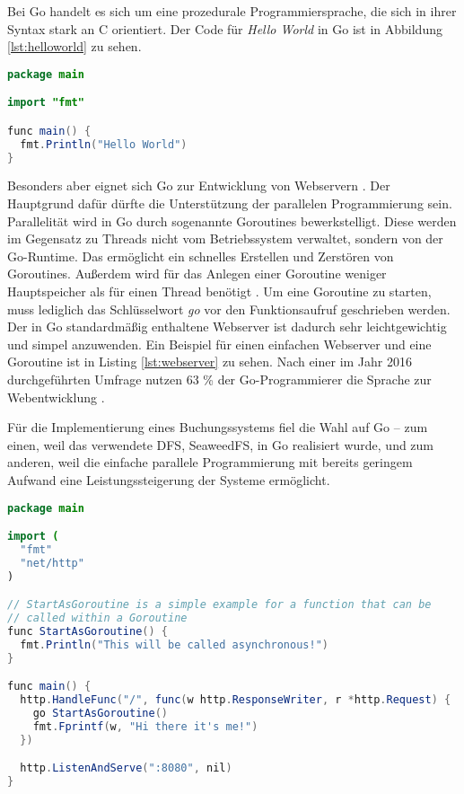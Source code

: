 \documentclass[12pt,oneside,a4paper,parskip]{scrbook}
\begin{document}
Bei Go handelt es sich um eine prozedurale Programmiersprache, die sich in ihrer Syntax stark an C orientiert. Der Code für \textit{Hello World} in Go ist in Abbildung \ref{lst:helloworld} zu sehen.
\begin{lstlisting}[label=lst:helloworld,
           language=Java,
           firstnumber=1,
           caption=Hello World mit Go.]           
package main

import "fmt"

func main() {
  fmt.Println("Hello World")
}

\end{lstlisting}

Besonders aber eignet sich Go zur Entwicklung von Webservern \cite[3-22]{gowebprogramming}. Der Hauptgrund dafür dürfte die Unterstützung der parallelen Programmierung sein. Parallelität wird in Go durch sogenannte Goroutines bewerkstelligt. Diese werden im Gegensatz zu Threads nicht vom Betriebssystem verwaltet, sondern von der Go-Runtime. Das ermöglicht ein schnelles Erstellen und Zerstören von Goroutines. Außerdem wird für das Anlegen einer Goroutine weniger Hauptspeicher als für einen Thread benötigt \cite{goroutines}. Um eine Goroutine zu starten, muss lediglich das Schlüsselwort \textit{go} vor den Funktionsaufruf geschrieben werden. Der in Go standardmäßig  enthaltene Webserver ist dadurch sehr leichtgewichtig und simpel anzuwenden. Ein Beispiel für einen einfachen Webserver und eine Goroutine ist in Listing \ref{lst:webserver} zu sehen. Nach einer im Jahr 2016 durchgeführten Umfrage nutzen 63 \% der Go-Programmierer die Sprache zur Webentwicklung \cite{gosurvey}.

Für die Implementierung eines Buchungssystems fiel die Wahl auf Go – zum einen, weil das verwendete DFS, SeaweedFS, in Go realisiert wurde, und zum anderen, weil die einfache parallele Programmierung mit bereits geringem Aufwand eine Leistungssteigerung der Systeme ermöglicht.

\begin{minipage}{\linewidth}
\begin{lstlisting}[label=lst:webserver,
           language=Java,
           firstnumber=1,
           caption=Code für einen einfachen Webserver in Go und Beispiel einer Goroutine.]           
package main

import (
  "fmt"
  "net/http"
)

// StartAsGoroutine is a simple example for a function that can be 
// called within a Goroutine
func StartAsGoroutine() {
  fmt.Println("This will be called asynchronous!")
}

func main() {
  http.HandleFunc("/", func(w http.ResponseWriter, r *http.Request) {
    go StartAsGoroutine()
    fmt.Fprintf(w, "Hi there it's me!")
  })

  http.ListenAndServe(":8080", nil)
}
\end{lstlisting}
\end{minipage}
\end{document}
